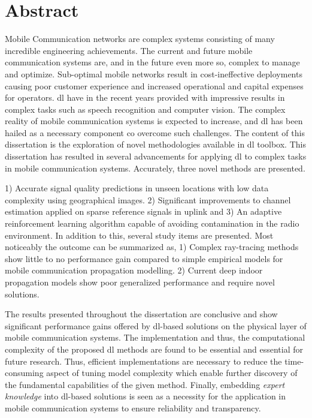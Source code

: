 \chapter*{Abstract}
Mobile Communication networks are complex systems consisting of many incredible engineering achievements. The current and future mobile communication systems are, and in the future even more so, complex to manage and optimize. Sub-optimal mobile networks result in cost-ineffective deployments causing poor customer experience and increased operational and capital expenses for operators. \acrfull{dl} have in the recent years provided with impressive results in complex tasks such as speech recognition and computer vision. The complex reality of mobile communication systems is expected to increase, and \gls{dl} has been hailed as a necessary component co overcome such challenges. The content of this dissertation is the exploration of novel methodologies available in \acrshort{dl} toolbox. This dissertation has resulted in several advancements for applying \gls{dl} to complex tasks in mobile communication systems. Accurately, three novel methods are presented. 

1) Accurate signal quality predictions in unseen locations with low data complexity using geographical images. 2) Significant improvements to channel estimation applied on sparse reference signals in uplink and 3) An adaptive reinforcement learning algorithm capable of avoiding contamination in the radio environment. In addition to this, several study items are presented. Most noticeably the outcome can be summarized as, 1) Complex ray-tracing methods show little to no performance gain compared to simple empirical models for mobile communication propagation modelling. 2) Current deep indoor propagation models show poor generalized performance and require novel solutions.

The results presented throughout the dissertation are conclusive and show significant performance gains offered by \gls{dl}-based solutions on the physical layer of mobile communication systems. The implementation and thus, the computational complexity of the proposed \gls{dl} methods are found to be essential and essential for future research. Thus, efficient implementations are necessary to reduce the time-consuming aspect of tuning model complexity which enable further discovery of the fundamental capabilities of the given method. Finally, embedding \emph{expert knowledge} into \gls{dl}-based solutions is seen as a necessity for the application in mobile communication systems to ensure reliability and transparency.